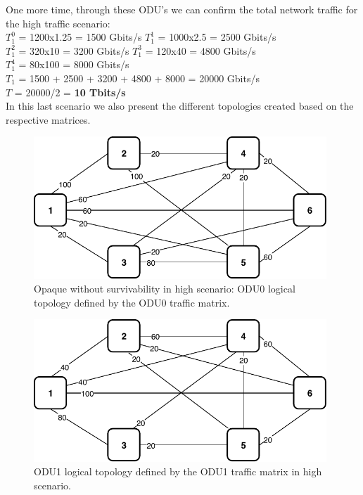 One more time, through these ODU's we can confirm the total network traffic for the high traffic scenario:\\

$T_1^0$ = 1200x1.25 = 1500 Gbits/s \qquad
$T_1^1$ = 1000x2.5 = 2500 Gbits/s \\

$T_1^2$ = 320x10 = 3200 Gbits/s \qquad
$T_1^3$ = 120x40 = 4800 Gbits/s \\

$T_1^4$ = 80x100 = 8000 Gbits/s \\

$T_{1}$ = 1500 + 2500 + 3200 + 4800 + 8000 = 20000 Gbits/s \\

$T$ = 20000/2 = \textbf{10 Tbits/s}\\

In this last scenario we also present the different topologies created based on the respective matrices.

\begin{figure}[h!]
\centering
\includegraphics[width=11cm]{sdf/ilp/opaque_survivability/figures/logical_topology_ODU0_high}
\caption{Opaque without survivability in high scenario: ODU0 logical topology defined by the ODU0 traffic matrix.}
\label{logical_ODU0_high}
\end{figure}

\begin{figure}[h!]
\centering
\includegraphics[width=11cm]{sdf/ilp/opaque_survivability/figures/logical_topology_ODU1_high}
\caption{ODU1 logical topology defined by the ODU1 traffic matrix in high scenario.}
\label{logical_ODU1_high}
\end{figure}

